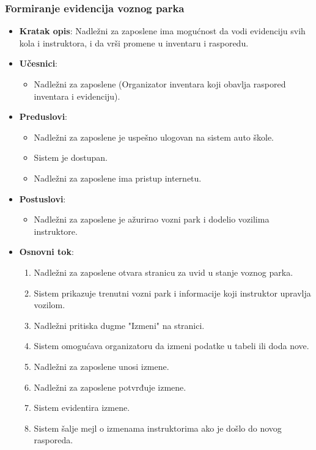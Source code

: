 \subsubsection{Formiranje evidencija voznog parka}
\label{subsubsec:vozni park}
\begin{itemize}
  \item \textbf{Kratak opis}: Nadležni za zaposlene ima mogućnost da vodi evidenciju svih kola i instruktora, i da vrši promene u inventaru i rasporedu.
  \item \textbf{Učesnici}:
    \begin{itemize}
    \item Nadležni za zaposlene (Organizator inventara koji obavlja raspored inventara i evidenciju).
    \end{itemize}
  \item \textbf{Preduslovi}:
    \begin{itemize}
    \item  Nadležni za zaposlene je uspešno ulogovan na sistem auto škole.
    \item  Sistem je dostupan.
    \item  Nadležni za zaposlene ima pristup internetu.
    \end{itemize}
  \item \textbf{Postuslovi}:
      \begin{itemize}
      \item  Nadležni za zaposlene je ažurirao vozni park i dodelio vozilima instruktore.
      \end{itemize}
  \item \textbf{Osnovni tok}:
      \begin{enumerate}
        \item Nadležni za zaposlene otvara stranicu za uvid  u stanje voznog parka.
        \item Sistem prikazuje trenutni vozni park i informacije koji instruktor upravlja vozilom.
        \item Nadležni pritiska dugme "Izmeni"  na stranici.
        \item Sistem omogućava organizatoru da izmeni podatke u tabeli ili doda nove.
        \item Nadležni za zaposlene unosi izmene.
        \item Nadležni za zaposlene potvrđuje izmene.
        \item Sistem evidentira izmene.
        \item Sistem šalje mejl o izmenama instruktorima ako je došlo do novog rasporeda.
      \end{enumerate}


\end{itemize}
